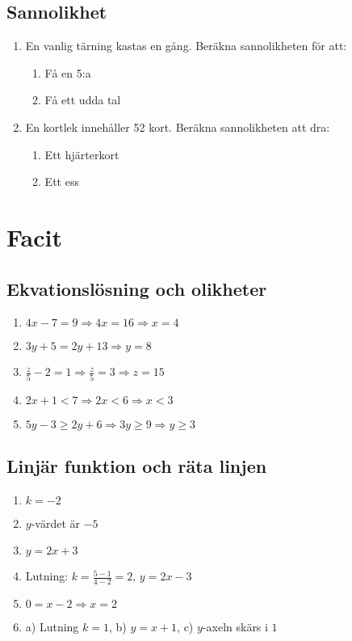 \documentclass[a4paper,11pt]{article}
\begin{document}
\subsection*{Sannolikhet}
\begin{enumerate}[label=\textbf{6.\arabic*.}]
    \item En vanlig tärning kastas en gång. Beräkna sannolikheten för att:
    \begin{enumerate}[label=\alph*)]
        \item Få en 5:a
        \item Få ett udda tal
    \end{enumerate}
    \item En kortlek innehåller 52 kort. Beräkna sannolikheten att dra:
    \begin{enumerate}[label=\alph*)]
        \item Ett hjärterkort
        \item Ett ess
    \end{enumerate}
\end{enumerate}

\newpage
\section*{Facit}

\subsection*{Ekvationslösning och olikheter}
\begin{enumerate}[label=\textbf{1.\roman*.}]
    \item $4x - 7 = 9 \Rightarrow 4x = 16 \Rightarrow x = 4$
    \item $3y + 5 = 2y + 13 \Rightarrow y = 8$
    \item $\frac{z}{5} - 2 = 1 \Rightarrow \frac{z}{5} = 3 \Rightarrow z = 15$
    \item $2x + 1 < 7 \Rightarrow 2x < 6 \Rightarrow x < 3$
    \item $5y - 3 \geq 2y + 6 \Rightarrow 3y \geq 9 \Rightarrow y \geq 3$
\end{enumerate}

\subsection*{Linjär funktion och räta linjen}
\begin{enumerate}[label=\textbf{2.\arabic*.}]
    \item $k = -2$
    \item $y$-värdet är $-5$
    \item $y = 2x + 3$
    \item Lutning: $k = \frac{5-1}{4-2} = 2$, $y = 2x - 3$
    \item $0 = x - 2 \Rightarrow x = 2$
    \item a) Lutning $k = 1$, b) $y = x + 1$, c) $y$-axeln skärs i $1$
\end{enumerate}
\end{document}
